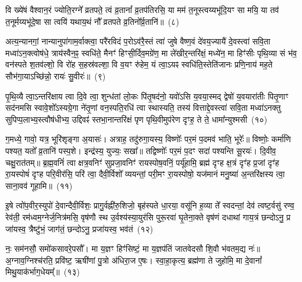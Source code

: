 वि ख्ये॑षं वैश्वान॒रं ज्योति॒रग्ने᳚ व्रतपते॒ त्वं व्र॒तानां᳚ व्र॒तप॑तिरसि॒ या मम॑ त॒नूस्त्वय्यभू॑दि॒यꣳ सा मयि॒ या तव॑ त॒नूर्मय्यभू॑दे॒षा सा त्वयि॑ यथाय॒थं नौ᳚ व्रतपते व्र॒तिनो᳚र्व्र॒तानि॑॥~(८)\ip

{\anuvakamend[{गा॒तु॒विद॒भ्येक॑त्रिꣳशच्च}]}

अत्य॒न्यानगां॒ नान्यानुपा॑गाम॒र्वाक्त्वा॒ परै॑रविदं प॒रो\-ऽव॑रै॒स्तं त्वा॑ जुषे वैष्ण॒वं दे॑वय॒ज्यायै॑ दे॒वस्त्वा॑ सवि॒ता मध्वा॑\-ऽन॒क्त्वोष॑धे॒ त्राय॑स्वैन॒ꣴ॒ स्वधि॑ते॒ मैनꣳ॑ हिꣳसी॒र्दिव॒मग्रे॑ण॒ मा ले॑खीर॒न्तरि॑क्षं॒ मध्ये॑न॒ मा हिꣳ॑सीः पृथि॒व्या सं भ॑व॒ वन॑स्पते श॒तव॑ल्\mbox{}शो॒ वि रो॑ह स॒हस्र॑वल्\mbox{}शा॒ वि व॒यꣳ रु॑हेम॒ यं त्वा॒\-ऽयꣴ स्वधि॑ति॒स्तेति॑जानः प्रणि॒नाय॑ मह॒ते सौभ॑गा॒या\-ऽच्छि॑न्नो॒ रायः॑ सु॒वीरः॑॥~(९)\ip

{\anuvakamend[{यं दश॑ च}]}

पृ॒थि॒व्यै त्वा॒\-ऽन्तरि॑क्षाय त्वा दि॒वे त्वा॒ शुन्ध॑तां लो॒कः पि॑तृ॒षद॑नो॒ यवो॑\-ऽसि य॒वया॒स्मद् द्वेषो॑ य॒वयारा॑तीः पितृ॒णाꣳ सद॑नमसि स्वावे॒शो᳚\-ऽस्यग्रे॒गा ने॑तृ॒णां वन॒स्पति॒रधि॑ त्वा स्थास्यति॒ तस्य॑ वित्ताद्दे॒वस्त्वा॑ सवि॒ता मध्वा॑\-ऽनक्तु सुपिप्प॒लाभ्य॒स्त्वौष॑धीभ्य॒ उद्दिवꣴ॑ स्तभा॒नान्तरि॑क्षं पृण पृथि॒वीमुप॑रेण दृꣳह॒ ते ते॒ धामा᳚न्युश्मसी~(१०)\ip

ग॒मध्ये॒ गावो॒ यत्र॒ भूरि॑शृङ्गा अ॒यासः॑। अत्राह॒ तदु॑रुगा॒यस्य॒ विष्णोः᳚ पर॒मं प॒दमव॑ भाति॒ भूरेः᳚॥ विष्णोः॒ कर्मा॑णि पश्यत॒ यतो᳚ व्र॒तानि॑ पस्प॒शे। इन्द्र॑स्य॒ युज्यः॒ सखा᳚॥ तद्विष्णोः᳚ पर॒मं प॒दꣳ सदा॑ पश्यन्ति सू॒रयः॑। दि॒वीव॒ चक्षु॒रात॑तम्॥ ब्र॒ह्म॒वनिं॑ त्वा क्षत्र॒वनिꣳ॑ सुप्रजा॒वनिꣳ॑ रायस्पोष॒वनिं॒ पर्यू॑हामि॒ ब्रह्म॑ दृꣳह क्ष॒त्रं दृꣳ॑ह प्र॒जां दृꣳ॑ह रा॒यस्पोषं॑ दृꣳह परि॒वीर॑सि॒ परि॑ त्वा॒ दैवी॒र्विशो᳚ व्ययन्तां॒ परी॒मꣳ रा॒यस्पोषो॒ यज॑मानं मनु॒ष्या॑ अ॒न्त\-रि॑क्षस्य त्वा॒ साना॒वव॑ गूहामि॥~(११)\ip

{\anuvakamend[{उ॒श्म॒सी॒ पोष॒मेका॒न्नविꣳ॑श॒तिश्च॑}]}

इ॒षे त्वो॑प॒वीर॒स्युपो॑ दे॒वान्दैवी॒र्विशः॒ प्रागु॒र्वह्नी॑रु॒शिजो॒ बृह॑स्पते धा॒रया॒ वसू॑नि ह॒व्या ते᳚ स्वदन्तां॒ देव॑ त्वष्ट॒र्वसु॑ रण्व॒ रेव॑ती॒ रम॑ध्वम॒ग्नेर्ज॒नित्र॑मसि॒ वृष॑णौ स्थ उ॒र्वश्य॑स्या॒युर॑सि पुरू॒रवा॑ घृ॒तेना॒क्ते वृष॑णं दधाथां गाय॒त्रं छन्दो\-ऽनु॒ प्र जा॑यस्व॒ त्रैष्टु॑भं॒ जाग॑तं॒ छन्दो\-ऽनु॒ प्रजा॑यस्व॒ भव॑तं~(१२)\ip

नः॒ सम॑नसौ॒ समो॑कसावरे॒पसौ᳚। मा य॒ज्ञꣳ हिꣳ॑सिष्टं॒ मा य॒ज्ञप॑तिं जातवेदसौ शि॒वौ भ॑वतम॒द्य नः॑॥ अ॒ग्नाव॒ग्निश्च॑रति॒ प्रवि॑ष्ट॒ ऋषी॑णां पु॒त्रो अ॑धिरा॒ज ए॒षः। स्वा॒हा॒कृत्य॒ ब्रह्म॑णा ते जुहोमि॒ मा दे॒वानां᳚ मिथु॒याक॑र्भाग॒\-धेयम्᳚॥~(१३)\ip

